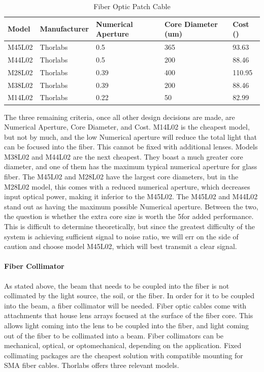 \begin{table}[H]
	\centering
	\label{table:Fiber Optic Patch Cable}
	\caption{Fiber Optic Patch Cable}
	\bigskip
	\begin{tabular}{|p{2cm}|p{2.5cm}|p{2cm}|p{2.75cm}|p{1.75cm}|}
	\hline
	Model & Manufacturer & Numerical Aperture & Core Diameter (um) & Cost (\textdollar)\\
	\hline
	M45L02 & Thorlabs & 0.5 & 365 & 93.63\\
	\hline
	M44L02 & Thorlabs & 0.5 & 200 & 88.46\\
	\hline
	M28L02 & Thorlabs & 0.39 & 400 & 110.95\\
	\hline
	M38L02 & Thorlabs & 0.39 & 200 & 88.46\\
	\hline
	M14L02 & Thorlabs & 0.22 & 50 & 82.99\\
	\hline
	\end{tabular}
\end{table}

The three remaining criteria, once all other design decisions are made, are Numerical Aperture, Core Diameter, and Cost. M14L02 is the cheapest model, but not by much, and the low Numerical aperture will reduce the total light that can be focused into the fiber. This cannot be fixed with additional lenses. Models M38L02 and M44L02 are the next cheapest. They boast a much greater core diameter, and one of them has the maximum typical numerical aperture for glass fiber. The M45L02 and M28L02 have the largest core diameters, but in the M28L02 model, this comes with a reduced numerical aperture, which decreases input optical power, making it inferior to the M45L02. The M45L02 and M44L02 stand out as having the maximum possible Numerical aperture. Between the two, the question is whether the extra core size is worth the 5\textdollar for added performance. This is difficult to determine theoretically, but since the greatest difficulty of the system is achieving sufficient signal to noise ratio, we will err on the side of caution and choose model M45L02, which will best transmit a clear signal.

\paragraph{Fiber Collimator}

As stated above, the beam that needs to be coupled into the fiber is not collimated by the light source, the soil, or the fiber. In order for it to be coupled into the beam, a fiber collimator will be needed. Fiber optic cables come with attachments that house lens arrays focused at the surface of the fiber core. This allows light coming into the lens to be coupled into the fiber, and light coming out of the fiber to be collimated into a beam. Fiber collimators can be mechanical, optical, or optomechanical, depending on the application. Fixed collimating packages are the cheapest solution with compatible mounting for SMA fiber cables. Thorlabs offers three relevant models.

